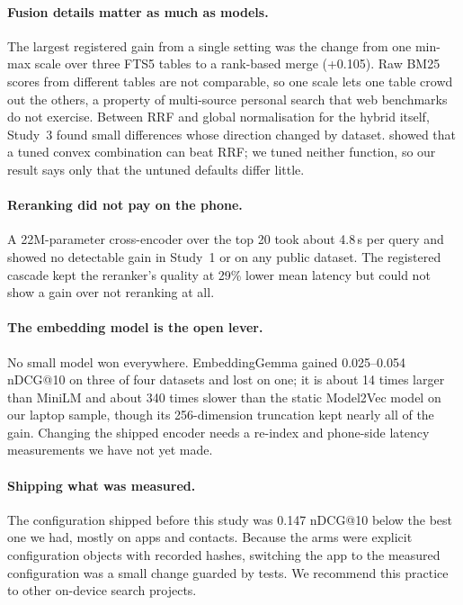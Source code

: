 \documentclass[pdflatex,sn-basic,Numbered]{sn-jnl}
\makeatletter
\newcommand{\ndcg}{nDCG@10}
\makeatother
\begin{document}
\paragraph{Fusion details matter as much as models.} The largest registered gain from a single setting was the change from one min-max scale over three FTS5 tables to a rank-based merge (+0.105). Raw BM25 scores from different tables are not comparable, so one scale lets one table crowd out the others, a property of multi-source personal search that web benchmarks do not exercise. Between RRF and global normalisation for the hybrid itself, Study~3 found small differences whose direction changed by dataset. \citet{bruch2023fusion} showed that a tuned convex combination can beat RRF; we tuned neither function, so our result says only that the untuned defaults differ little.

\paragraph{Reranking did not pay on the phone.} A 22M-parameter cross-encoder over the top 20 took about 4.8\,s per query and showed no detectable gain in Study~1 or on any public dataset. The registered cascade kept the reranker's quality at 29\% lower mean latency but could not show a gain over not reranking at all.

\paragraph{The embedding model is the open lever.} No small model won everywhere. EmbeddingGemma gained 0.025--0.054 \ndcg{} on three of four datasets and lost on one; it is about 14 times larger than MiniLM and about 340 times slower than the static Model2Vec model on our laptop sample, though its 256-dimension truncation kept nearly all of the gain. Changing the shipped encoder needs a re-index and phone-side latency measurements we have not yet made.

\paragraph{Shipping what was measured.} The configuration shipped before this study was 0.147 \ndcg{} below the best one we had, mostly on apps and contacts. Because the arms were explicit configuration objects with recorded hashes, switching the app to the measured configuration was a small change guarded by tests. We recommend this practice to other on-device search projects.
\end{document}
